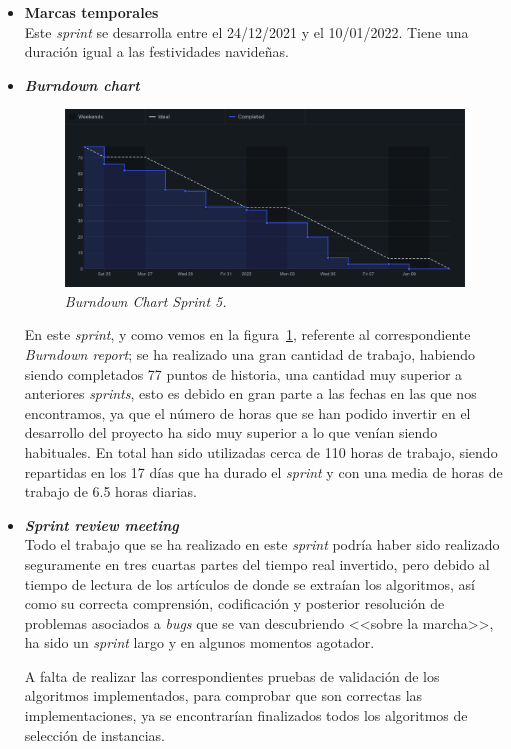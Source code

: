 \begin{itemize}
\item \textbf{Marcas temporales}\\
Este \textit{sprint} se desarrolla entre el 24/12/2021 y el 10/01/2022. Tiene una duración igual a las festividades navideñas.
\item \textbf{\textit{Burndown chart}}\\
\begin{figure}
\begin{center}
\includegraphics[width=\textwidth]{../img/anexos/sprints/BD-Sprint5}
\caption{\textit{Burndown Chart Sprint 5.}}\label{fig:BD-Sprint5}
\end{center}
\end{figure}
En este \textit{sprint}, y como vemos en la figura~\ref{fig:BD-Sprint5}, referente al correspondiente \textit{Burndown report}; se ha realizado una gran cantidad de trabajo, habiendo siendo completados 77 puntos de historia, una cantidad muy superior a anteriores \textit{sprints}, esto es debido en gran parte a las fechas en las que nos encontramos, ya que el número de horas que se han podido invertir en el desarrollo del proyecto ha sido muy superior a lo que venían siendo habituales. En total han sido utilizadas cerca de 110 horas de trabajo, siendo repartidas en los 17 días que ha durado el \textit{sprint} y con una media de horas de trabajo de 6.5 horas diarias. 

\item \textbf{\textit{Sprint review meeting}}\\
Todo el trabajo que se ha realizado en este \textit{sprint} podría haber sido realizado seguramente en tres cuartas partes del tiempo real invertido, pero debido al tiempo de lectura de los artículos de donde se extraían los algoritmos, así como su correcta comprensión, codificación y posterior resolución de problemas asociados a \textit{bugs} que se van descubriendo <<sobre la marcha>>, ha sido un \textit{sprint} largo y en algunos momentos agotador. 

A falta de realizar las correspondientes pruebas de validación de los algoritmos implementados, para comprobar que son correctas las implementaciones, ya se encontrarían finalizados todos los algoritmos de selección de instancias.

\end{itemize}
